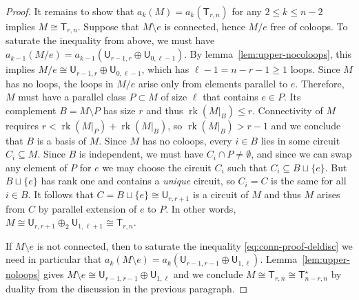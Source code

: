 \documentclass[pagesize,paper=A4,11pt,bibliography=totoc,oneside]{scrartcl}
\DeclareMathOperator{\rk}{rk}
\newcommand{\UM}[2]{\mathsf{U}_{#2,#1}} %
\newcommand{\MM}[2]{\mathsf{T}_{#2,#1}} %
\begin{document}
\begin{proof}
    It remains to show that $a_k(M)=a_k(\MM{n}{r})$ for any $2\leq k\leq n-2$ implies $M\cong \MM{n}{r}$. Suppose that $M\setminus e$ is connected, hence $M/e$ free of coloops. To saturate the inequality from above, we must have $a_{k-1}(M/e)=a_{k-1}(\UM{r}{r-1}\oplus \UM{\ell-1}{0})$. By lemma~\ref{lem:upper-nocoloops}, this implies $M/e\cong \UM{r}{r-1}\oplus \UM{\ell-1}{0}$, which has $\ell-1=n-r-1\geq 1$ loops. Since $M$ has no loops, the loops in $M/e$ arise only from elements parallel to $e$. Therefore, $M$ must have a parallel class $P\subset M$ of size $\ell$ that contains $e\in P$. Its complement $B=M\setminus P$ has size $r$ and thus $\rk(M|_B)\leq r$. Connectivity of $M$ requires $r<\rk(M|_P)+\rk(M|_B)$, so $\rk(M|_B)> r-1$ and we conclude that $B$ is a basis of $M$. Since $M$ has no coloops, every $i\in B$ lies in some circuit $C_i\subseteq M$. Since $B$ is independent, we must have $C_i\cap P\neq\emptyset$, and since we can swap any element of $P$ for $e$ we may choose the circuit $C_i$ such that $C_i\subseteq B\sqcup\{e\}$. But $B\sqcup \{e\}$ has rank one and contains a \emph{unique} circuit, so $C_i=C$ is the same for all $i\in B$. It follows that $C=B\sqcup\{e\}\cong\UM{r+1}{r}$ is a circuit of $M$ and thus $M$ arises from $C$ by parallel extension of $e$ to $P$. In other words, $M\cong \UM{r+1}{r}\oplus_2 \UM{\ell+1}{1}\cong \MM{n}{r}$.

    If $M\setminus e$ is not connected, then to saturate the inequality \eqref{eq:conn-proof-deldisc} we need in particular that $a_k(M\setminus e)=a_k(\UM{r-1}{r-1}\oplus\UM{\ell}{1})$. Lemma~\ref{lem:upper-noloops} gives $M\setminus e\cong \UM{r-1}{r-1}\oplus\UM{\ell}{1}$ and we conclude $M\cong\MM{n}{r}\cong\MM{n}{n-r}^\star$ by duality from the discussion in the previous paragraph.
\end{proof}
\end{document}
